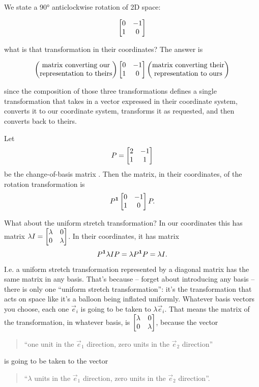 We state a 90° anticlockwise rotation of 2D space:

$$
\begin{bmatrix}0 & -1\\1 & 0\\ \end{bmatrix}
$$

what is that transformation in their coordinates? The answer is

$$
\begin{pmatrix}\text{matrix converting our}\\\text{representation to theirs} \\ \end{pmatrix}
\begin{bmatrix}0 & -1\\1 & 0\\ \end{bmatrix}
\begin{pmatrix}\text{matrix converting their}\\\text{representation to ours} \\ \end{pmatrix}
$$

since the composition of those three transformations defines a single
transformation that takes in a vector expressed in their coordinate system,
converts it to our coordinate system, transforms it as requested, and then
converts back to theirs.

Let
\begin{align*}
  P = \begin{bmatrix}2 & -1\\1 & 1\\ \end{bmatrix}
\end{align*}
be the change-of-basis matrix . Then the matrix, in their coordinates, of the
rotation transformation is
$$
P^{\mathbf 1}\begin{bmatrix}0 & -1\\1 & 0\\ \end{bmatrix} P.
$$

What about the uniform stretch transformation? In our coordinates this has
matrix $\lambda I = \begin{bmatrix}\lambda & 0\\0 & \lambda\\ \end{bmatrix}$. In their coordinates, it has matrix
\begin{align*}
P^{\mathbf 1}\lambda I P = \lambda P^{\mathbf 1} P = \lambda I.
\end{align*}
I.e. a uniform stretch transformation represented by a diagonal matrix has the
same matrix in any basis. That's because -- forget about introducing any basis
-- there is only one ``uniform stretch transformation'': it's the
transformation that acts on space like it's a balloon being inflated
uniformly. Whatever basis vectors you choose, each one $\vec e_i$ is going to be taken
to $\lambda \vec e_i$. That means the matrix of the transformation, in whatever basis,
is $\begin{bmatrix}\lambda & 0\\0 & \lambda\\ \end{bmatrix}$, because the vector
\begin{quote}
``one unit in the $\vec e_1$ direction, zero units in the $\vec e_2$ direction''
\end{quote}
is going to be taken to the vector
\begin{quote}
``$\lambda$ units in the $\vec e_1$ direction, zero units in the $\vec e_2$ direction''.
\end{quote}


